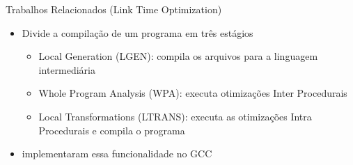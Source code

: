 \begin{frame}{Trabalhos Relacionados (Link Time Optimization)}
    \begin{itemize}
        \item Divide a compilação de um programa em três estágios
            \begin{itemize}
                \item Local Generation (LGEN): compila os arquivos para a linguagem intermediária
                \item Whole Program Analysis (WPA): executa otimizações Inter Procedurais
                \item Local Transformations (LTRANS): executa as otimizações Intra Procedurais e compila o programa
            \end{itemize}

        \item \citep{glek2010optimizing} implementaram essa funcionalidade no GCC
    \end{itemize}
\end{frame}

